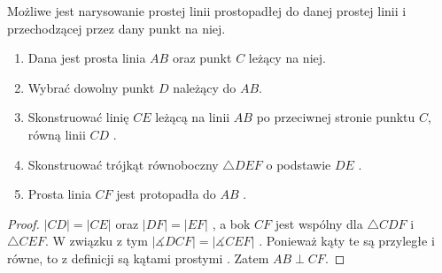 \documentclass[12pt, a4paper]{scrartcl}
\begin{document}
\begin{theorem}
    Możliwe jest narysowanie prostej linii prostopadłej do danej prostej linii
    i przechodzącej przez dany punkt na niej.

    \begin{enumerate}
        \item Dana jest prosta linia \(AB\) oraz punkt \(C\) leżący na niej.
        \item Wybrać dowolny punkt \(D\) należący do \(AB\).
        \item Skonstruować linię \(CE\) leżącą na linii \(AB\) po przeciwnej
            stronie punktu \(C\), równą linii \(CD\) .
        \item Skonstruować trójkąt równoboczny \(\triangle DEF\) o podstawie
            \(DE\) .
        \item Prosta linia \(CF\) jest protopadła do \(AB\) .
    \end{enumerate}

    \begin{figure}[!h]
        \begin{center}
        \end{center}
    \end{figure}

    \begin{proof}
        \(|CD| = |CE|\)  oraz \(|DF| = |EF|\) , a bok \(CF\)
        jest wspólny dla \(\triangle CDF\) i \(\triangle CEF\). W związku z tym
        \(|\measuredangle DCF| = |\measuredangle CEF|\) . Ponieważ
        kąty te są przyległe i równe, to z definicji są kątami prostymi
        . Zatem \(AB \perp CF\).
    \end{proof}
\end{theorem}
\end{document}
